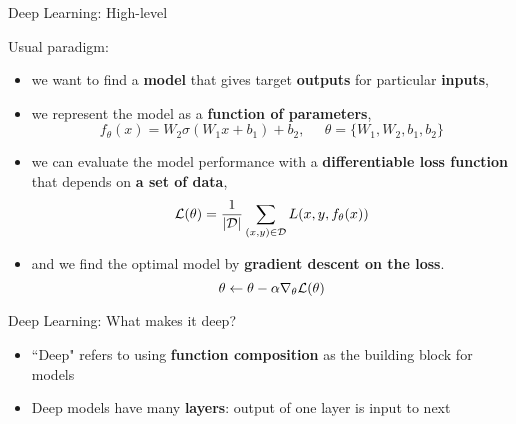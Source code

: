 \begin{frame}{Deep Learning: High-level}

Usual paradigm:
%
\begin{itemize}
\item we want to find a \textbf{model} that gives target \textbf{outputs} for particular \textbf{inputs},
\item we represent the model as a \textbf{function of parameters},
\begin{equation*}
f_{\theta}(x) = W_2 \sigma\left( W_1 x + b_1 \right) + b_2, \;\;\;\;\; \theta = \{W_1, W_2, b_1, b_2\}
\end{equation*}
\item we can evaluate the model performance with a \textbf{differentiable loss function} that depends on \textbf{a set of data},
\begin{equation*}
{\mathcal L}(\theta) = \frac{1}{|{\mathcal D}|}\sum_{(x,y)\in{\mathcal D}} L(x,y,f_{\theta}(x))
\end{equation*}
\item and we find the optimal model by \textbf{gradient descent on the loss}.
\begin{equation*}
\theta \leftarrow \theta - \alpha \nabla_{\theta} {\mathcal L}(\theta)
\end{equation*}
\end{itemize}

\end{frame}

\begin{frame}{Deep Learning: What makes it deep?}

\begin{itemize}
\item ``Deep" refers to using \textbf{function composition} as the building block for models

\item Deep models have many \textbf{layers}: output of one layer is input to next
\end{itemize}



\end{frame}


